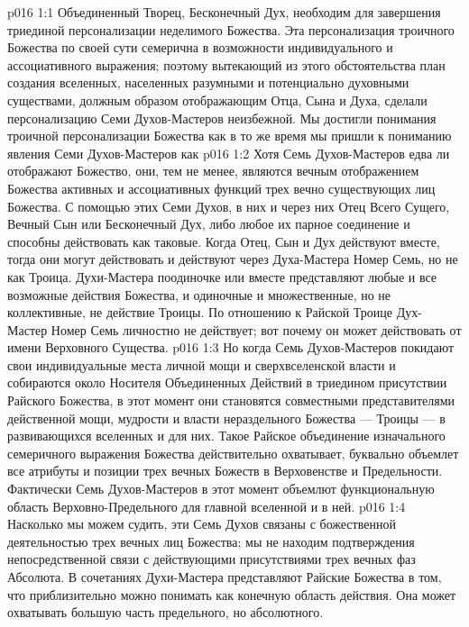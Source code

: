 \vs p016 1:1 Объединенный Творец, Бесконечный Дух, необходим для завершения триединой персонализации неделимого Божества. Эта персонализация троичного Божества по своей сути семерична в возможности индивидуального и ассоциативного выражения; поэтому вытекающий из этого обстоятельства план создания вселенных, населенных разумными и потенциально духовными существами, должным образом отображающим Отца, Сына и Духа, сделали персонализацию Семи Духов\hyp{}Мастеров неизбежной. Мы достигли понимания троичной персонализации Божества как  в то же время мы пришли к пониманию явления Семи Духов\hyp{}Мастеров как 
\vs p016 1:2 Хотя Семь Духов\hyp{}Мастеров едва ли отображают  Божество, они, тем не менее, являются вечным отображением Божества  активных и ассоциативных функций трех вечно существующих лиц Божества. С помощью этих Семи Духов, в них и через них Отец Всего Сущего, Вечный Сын или Бесконечный Дух, либо любое их парное соединение и способны действовать как таковые. Когда Отец, Сын и Дух действуют вместе, тогда они могут действовать и действуют через Духа\hyp{}Мастера Номер Семь, но не как Троица. Духи\hyp{}Мастера поодиночке или вместе представляют любые и все возможные действия Божества, и одиночные и множественные, но не коллективные, не действие Троицы. По отношению к Райской Троице Дух\hyp{}Мастер Номер Семь личностно не действует; вот почему он может действовать  от имени Верховного Существа.
\vs p016 1:3 Но когда Семь Духов\hyp{}Мастеров покидают свои индивидуальные места личной мощи и сверхвселенской власти и собираются около Носителя Объединенных Действий в триедином присутствии Райского Божества, в этот момент они становятся совместными представителями действенной мощи, мудрости и власти нераздельного Божества --- Троицы --- в развивающихся вселенных и для них. Такое Райское объединение изначального семеричного выражения Божества действительно охватывает, буквально объемлет все атрибуты и позиции трех вечных Божеств в Верховенстве и Предельности. Фактически Семь Духов\hyp{}Мастеров в этот момент объемлют функциональную область Верховно\hyp{}Предельного для главной вселенной и в ней.
\vs p016 1:4 Насколько мы можем судить, эти Семь Духов связаны с божественной деятельностью трех вечных лиц Божества; мы не находим подтверждения непосредственной связи с действующими присутствиями трех вечных фаз Абсолюта. В сочетаниях Духи\hyp{}Мастера представляют Райские Божества в том, что приблизительно можно понимать как конечную область действия. Она может охватывать большую часть предельного, но  абсолютного.
